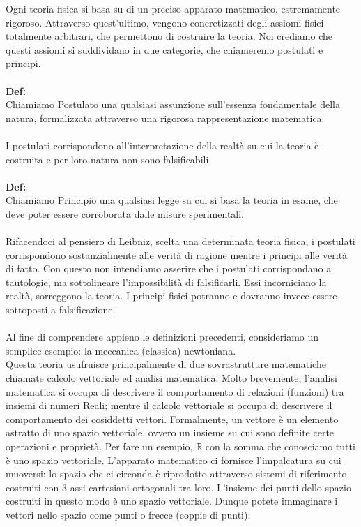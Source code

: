 \documentclass[]{article}
\begin{document}
	Ogni teoria fisica si basa su di un preciso apparato matematico, estremamente rigoroso. Attraverso quest'ultimo, vengono concretizzati degli assiomi fisici totalmente arbitrari, che permettono di costruire la teoria. Noi crediamo che questi assiomi si suddividano in due categorie, che chiameremo postulati e principi.\\
	\\
	\textbf{Def:}\\
	Chiamiamo Postulato una qualsiasi assunzione sull'essenza fondamentale della natura, formalizzata attraverso una rigorosa rappresentazione matematica.
	\\
	\\
	I postulati corrispondono all'interpretazione della realtà su cui la teoria è costruita e per loro natura non sono falsificabili.
	\\\\
	\textbf{Def:}\\
	Chiamiamo Principio una qualsiasi legge su cui si basa la teoria in esame, che deve poter essere corroborata dalle misure sperimentali.
	\\
	\\
	Rifacendoci al pensiero di Leibniz, scelta una determinata teoria fisica, i postulati corrispondono sostanzialmente alle verità di ragione mentre i principi alle verità di fatto. Con questo non intendiamo asserire che i postulati corrispondano a tautologie, ma sottolineare l'impossibilità di falsificarli. Essi incorniciano la realtà, sorreggono la teoria. I principi fisici potranno e dovranno invece essere sottoposti a falsificazione.\\
	\\
	Al fine di comprendere appieno le definizioni precedenti, consideriamo un semplice esempio: la meccanica (classica) newtoniana.\\
	Questa teoria usufruisce principalmente di due sovrastrutture matematiche chiamate calcolo vettoriale ed analisi matematica. Molto brevemente, l'analisi matematica si occupa di descrivere il comportamento di relazioni (funzioni) tra insiemi di numeri Reali; mentre il calcolo vettoriale si occupa di descrivere il comportamento dei cosiddetti vettori. Formalmente, un vettore è un elemento astratto di uno spazio vettoriale, ovvero un insieme su cui sono definite certe operazioni e proprietà. Per fare un esempio, $\mathbb{R}$ con la somma che conosciamo tutti è uno spazio vettoriale. L'apparato matematico ci fornisce l'impalcatura su cui muoversi: lo spazio che ci circonda è riprodotto attraverso sistemi di riferimento costruiti con 3 assi cartesiani ortogonali tra loro. L'insieme dei punti dello spazio costruiti in questo modo è uno spazio vettoriale. Dunque potete immaginare i vettori nello spazio come punti o frecce (coppie di punti). \\
\end{document}
